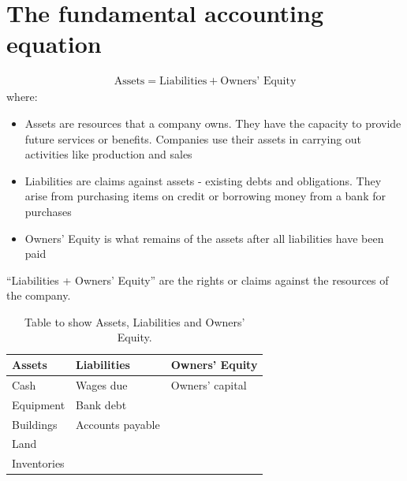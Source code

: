 \section{The fundamental accounting equation}
\begin{gather}
    \textrm{Assets} = \textrm{Liabilities} + \textrm{Owners' Equity}
\end{gather}
where:
\begin{itemize}
    \item Assets are resources that a company owns. They have the capacity to provide future services or benefits. Companies use their assets in carrying out activities like production and sales
    \item Liabilities are claims against assets - existing debts and obligations. They arise from purchasing items on credit or borrowing money from a bank for purchases
    \item Owners' Equity is what remains of the assets after all liabilities have been paid
\end{itemize}
``Liabilities + Owners' Equity'' are the rights or claims against the resources of the company.
\begin{table}[H]
    \centering
    \begin{tabular}{@{}lll@{}}
        \toprule
        \textbf{Assets} & \textbf{Liabilities} & \textbf{Owners' Equity}\\
        \midrule
        Cash & Wages due & Owners' capital\\
        Equipment & Bank debt &\\
        Buildings & Accounts payable &\\
        Land & & \\
        Inventories & & \\
        \bottomrule
    \end{tabular}  
    \caption{Table to show Assets, Liabilities and Owners' Equity.}  
\end{table}
